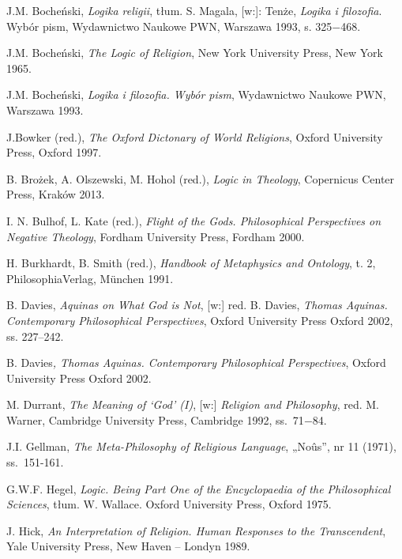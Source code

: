 \clearpage
\begin{thebibliography}{99}
\addtocounter{section}{1}

\bibitem{} J.M. Bocheński, \textit{Logika religii}, tłum. S. Magala, [w:]: Tenże, \textit{Logika i
filozofia}. Wybór pism, Wydawnictwo Naukowe PWN, Warszawa 1993, s.
325$-$468.

\bibitem{} J.M. Bocheński, \textit{The Logic of Religion}, New York University
Press, New York 1965.

\bibitem{} J.M. Bocheński, \textit{Logika i filozofia. Wybór pism}, Wydawnictwo
Naukowe PWN, Warszawa 1993.

\bibitem{} J.Bowker (red.), \textit{The Oxford Dictonary of World Religions},
Oxford University Press, Oxford 1997.

\bibitem{} B. Brożek, A. Olszewski, M. Hohol (red.), \textit{Logic in Theology},
Copernicus Center Press, Kraków 2013.

\bibitem{} I. N. Bulhof, L. Kate (red.), \textit{Flight of the Gods. Philosophical
Perspectives on Negative Theology}, Fordham University Press, Fordham
2000.

\bibitem{} H. Burkhardt, B. Smith (red.), \textit{Handbook of Metaphysics and
Ontology}, t. 2, PhilosophiaVerlag, München 1991.

\bibitem{} B. Davies, \textit{Aquinas on What God is Not}, [w:] red. B. Davies,
\textit{Thomas Aquinas. Contemporary Philosophical Perspectives},
Oxford University Press Oxford 2002, ss. 227–242.

\bibitem{} B. Davies\textit{, Thomas Aquinas. Contemporary Philosophical
Perspectives}, Oxford University Press Oxford 2002.

\bibitem{} M. Durrant,\textit{ The Meaning of ‘God’ (I)}, [w:] \textit{Religion and
Philosophy}, red.  M. Warner, Cambridge University Press, Cambridge
1992, ss.~71$-$84.

\bibitem{} J.I. Gellman, \textit{The Meta-Philosophy of Religious Language},
„No\^us”, nr 11 (1971), ss.~151-161.

\bibitem{} G.W.F. Hegel, \textit{Logic. Being Part One of the Encyclopaedia of the
Philosophical Sciences}, tłum. W. Wallace. Oxford University Press,
Oxford 1975.

\bibitem{} J. Hick,\textit{ An Interpretation of Religion. Human Responses to the
Transcendent}, Yale University Press, New Haven – Londyn 1989.


\end{thebibliography}
